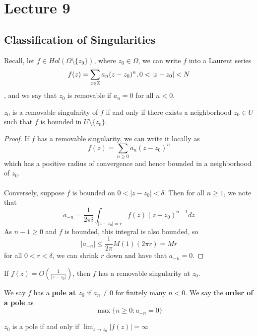 \section{Lecture 9}

\subsection{Classification of Singularities}

Recall, let $f \in Hol(\Omega \setminus \{z_0\})$, where $z_0 \in \Omega$, we can write $f$ into a Laurent series
\[f(z) = \sum_{z \in \mathbb{Z}} a_n (z - z_0)^n, 0 < |z - z_0| < N\]
, and we say that $z_0$ is removable if $a_n = 0$ for all $n < 0$.

\begin{theorem}
$z_0$ is a removable singularity of $f$ if and only if there exists a neighborhood $z_0 \in U$ such that $f$ is bounded in $U \setminus \{z_0\}$.
\end{theorem}

\begin{proof}
If $f$ has a removable singularity, we can write it locally as
\[f(z) = \sum_{n \geq 0} a_n (z - z_0)^n\]
which has a positive radius of convergence and hence bounded in a neighborhood of $z_0$.\\\\
Conversely, suppose $f$ is bounded on $0 < |z - z_0| < \delta$. Then for all $n \geq 1$, we note that
\[a_{-n} = \frac{1}{2\pi i} \int_{|z - z_0| = r} f(z) (z - z_0)^{n-1} dz \]
As $n-1 \geq 0$ and $f$ is bounded, this integral is also bounded, so
\[|a_{-n}| \leq \frac{1}{2\pi} M (1) (2\pi r) = Mr\]
for all $0 < r < \delta$, we can shrink $r$ down and have that $a_{-n} = 0$.
\end{proof}

\begin{remark}
If $f(z) = O(\frac{1}{|z - z_0|})$, then $f$ has a removable singularity at $z_0$.
\end{remark}

We say $f$ has a \textbf{pole at $z_0$} if $a_n \neq 0$ for finitely many $n < 0$. We say the \textbf{order of a pole} as
        \[\max \{n \geq 0: a_{-n} = 0\}\]
        
\begin{theorem}
$z_0$ is a pole if and only if $\lim_{z \to z_0} |f(z)| = \infty$
\end{theorem}

